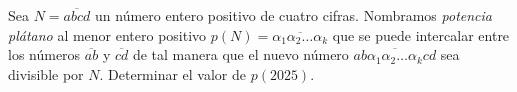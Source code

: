 Sea $N=\overline{abcd}$ un número entero positivo de cuatro cifras. Nombramos \textit{potencia plátano} al menor entero positivo $p(N)=\overline{\alpha_1\alpha_2\ldots\alpha_k}$ que se puede intercalar entre los números $\overline{ab}$ y $\overline{cd}$ de tal manera que el nuevo número $\overline{ab\alpha_1\alpha_2\ldots\alpha_kcd}$ sea divisible por $N$. Determinar el valor de $p(2025)$.
